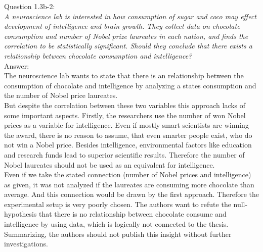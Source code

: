 
Question 1.3b-2:\\	
\textsl{A neuroscience lab is interested in how consumption of sugar and coco may effect development of intelligence and brain growth. They collect data on chocolate consumption and number of Nobel prize laureates in each nation, and finds the correlation to be statistically significant. Should they conclude that there exists a relationship between chocolate consumption and intelligence?}\\

Answer:\\
The neuroscience lab wants to state that there is an relationship between the consumption of chocolate and intelligence by analyzing a states consumption and the number of Nobel price laureates.\\

But despite the correlation between these two variables this approach lacks of some important aspects. Firstly, the researchers use the number of won Nobel prices as a variable for intelligence. Even if mostly smart scientists are winning the award, there is no reason to assume, that even smarter people exist, who do not win a Nobel price. Besides intelligence, environmental factors like education and research funds lead to superior scientific results. Therefore the number of Nobel laureates should not be used as an equivalent for intelligence.\\

Even if we take the stated connection (number of Nobel prices and intelligence) as given, it was not analyzed if the laureates are consuming more chocolate than average. And this connection would be drawn by the first approach. Therefore the experimental setup is very poorly chosen. The authors want to refute the null-hypothesis that there is no relationship between chocolate consume and intelligence by using data, which is logically not connected to the thesis.\\

Summarizing, the authors should not publish this insight without further investigations.\\

